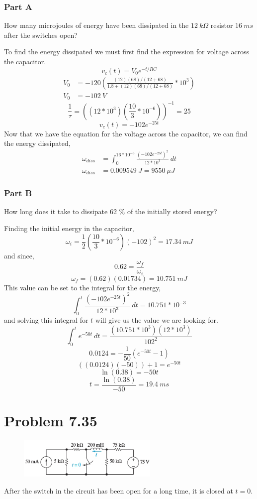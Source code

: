 \documentclass[12pt]{article}
\begin{document}
    \subsubsection*{Part A} How many microjoules of energy have been dissipated in the $ 12\ k\Omega $ resistor $ 16\ ms $ after the switches open? \\
    \par To find the energy dissipated we must first find the expression for voltage across the capacitor.
    \[
        v_c(t) = V_0 e^{-t / RC}
    \]
    \begin{align*}
        V_0 &= -120 \left( \frac{(12)(68) / (12+68)}{1.8 + (12)(68) / (12+68)} * 10^{3} \right) \\
        V_0 &= -102\ V
    \end{align*}
    \[
        \frac{1}{\tau} = ((12 * 10^{3})(\frac{10}{3} * 10^{-6}))^{-1} = 25
    \]
    \[
        v_c (t) = -102 e^{-25t}
    \]
    Now that we have the equation for the voltage across the capacitor, we can find the energy dissipated,
    \begin{align*}
        \omega_{diss} &= \int_0^{16*10^{-3}} \frac{(-102 e^{-25t})^2 }{12 * 10^{3}}\ dt \\
        \omega_{diss} &= 0.009549\ J = \boxed{9550\ \mu J}
    \end{align*}
    \subsubsection*{Part B} How long does it take to dissipate 62 \% of the initially stored energy? \\
    \par Finding the initial energy in the capacitor,
    \[
        \omega_{i} = \frac{1}{2} \left( \frac{10}{3} * 10^{-6} \right) (-102)^2 = 17.34\ mJ
    \]
    and since,
    \[
        0.62 = \frac{\omega_{f}}{\omega_{i}}
    \]
    \[
        \omega_{f} = (0.62) (0.01734) = 10.751\ mJ
    \]
    This value can be set to the integral for the energy,
    \[
        \int_0^t \frac{(-102e^{-25t})^2}{12 * 10^{3}}\ dt = 10.751 * 10^{-3}
    \]
    and solving this integral for $ t $ will give us the value we are looking for.
    \[
        \int_0^t e^{-50t}\ dt  = \frac{(10.751 * 10^{3})(12 * 10^{3})}{102^2}
    \]
    \[
        0.0124 = -\frac{1}{50} \left( e^{-50t} - 1 \right)
    \]
    \[
        ((0.0124)(-50)) + 1 = e^{-50t}
    \]
    \[
        \ln(0.38) = -50t
    \]
    \[
        t = \frac{\ln(0.38)}{-50} = \boxed{19.4\ ms}
    \]
    \section*{Problem 7.35}
    \begin{figure}[h]
        \centering
        \includegraphics[width=0.6\textwidth]{7.35 Figure.png}
    \end{figure}
    \par After the switch in the circuit has been open for a long time, it is closed at $ t = 0 $.
\end{document}
